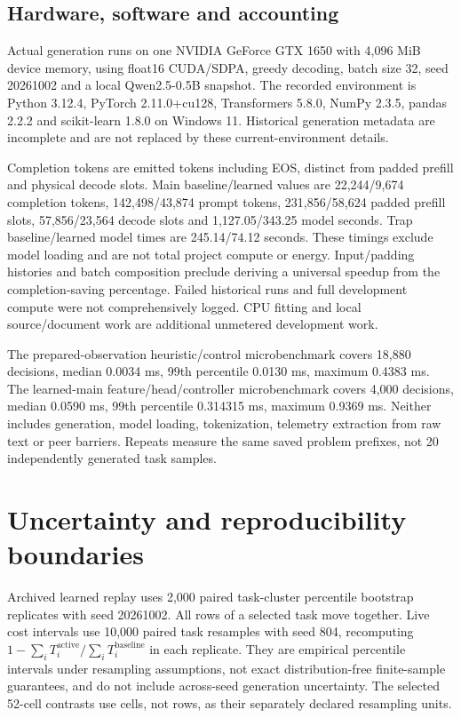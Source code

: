 \subsection{Hardware, software and accounting}
Actual generation runs on one NVIDIA GeForce GTX 1650 with 4,096 MiB device
memory, using float16 CUDA/SDPA, greedy decoding, batch size 32,
seed 20261002 and a local Qwen2.5-0.5B snapshot.
The recorded environment is Python 3.12.4, PyTorch 2.11.0+cu128,
Transformers 5.8.0, NumPy 2.3.5, pandas 2.2.2 and scikit-learn 1.8.0
on Windows 11. Historical generation metadata are incomplete and are not
replaced by these current-environment details.

Completion tokens are emitted tokens including EOS, distinct from padded
prefill and physical decode slots. Main baseline/learned values are
22,244/9,674 completion tokens, 142,498/43,874 prompt tokens,
231,856/58,624 padded prefill slots, 57,856/23,564 decode slots and
1,127.05/343.25 model seconds. Trap baseline/learned model times are
245.14/74.12 seconds. These timings exclude model loading and are not
total project compute or energy. Input/padding histories and batch composition
preclude deriving a universal speedup from the completion-saving percentage.
Failed historical runs and full development compute were not comprehensively
logged. CPU fitting and local source/document work are additional unmetered
development work.

The prepared-observation heuristic/control microbenchmark covers 18,880
decisions, median 0.0034 ms, 99th percentile 0.0130 ms, maximum 0.4383 ms.
The learned-main feature/head/controller microbenchmark covers 4,000 decisions,
median 0.0590 ms, 99th percentile 0.314315 ms, maximum 0.9369 ms.
Neither includes generation, model loading, tokenization, telemetry extraction
from raw text or peer barriers. Repeats measure the same saved problem prefixes,
not 20 independently generated task samples.

\section{Uncertainty and reproducibility boundaries}
\label{app:uncertainty}
Archived learned replay uses 2,000 paired task-cluster percentile bootstrap
replicates with seed 20261002. All rows of a selected task move together.
Live cost intervals use 10,000 paired task resamples with seed 804, recomputing
\(1-\sum_i T_i^{\mathrm{active}}/\sum_i T_i^{\mathrm{baseline}}\) in each
replicate. They are empirical percentile intervals under resampling assumptions,
not exact distribution-free finite-sample guarantees, and do not include
across-seed generation uncertainty. The selected 52-cell contrasts use cells,
not rows, as their separately declared resampling units.

